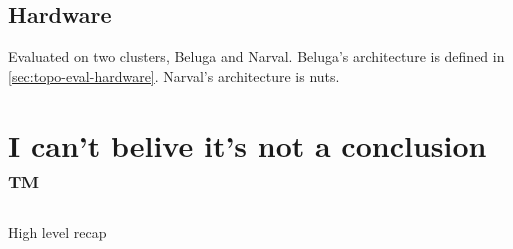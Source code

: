 \lstset{label = lst:mif_ar_microbmark}
\lstset{caption = MIF microbenchmark}


\subsection{Hardware}
Evaluated on two clusters, Beluga and Narval.
Beluga's architecture is defined in \ref{sec:topo-eval-hardware}.
Narval's architecture is nuts.

\section{I can't belive it's not a conclusion ™}
High level recap

